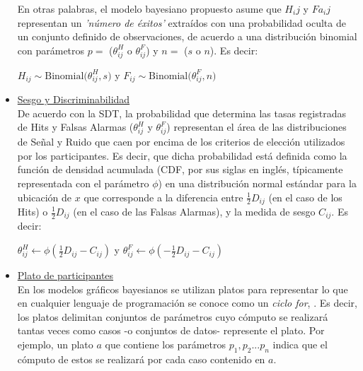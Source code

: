 \begin{itemize}
En otras palabras, el modelo bayesiano propuesto asume que $H_ij$ y $Fa_ij$ representan un \textit{'número de éxitos'} extraídos con una probabilidad oculta de un conjunto definido de observaciones, de acuerdo a una distribución binomial con parámetros $p=$ ($\theta^H_{ij}$ o $\theta^F_{ij}$) y $n=$ ($s$ o $n$). Es decir:\\

\begin{center}
$H_{ij}\sim \mathrm{Binomial}\bigl(\theta^H_{ij}, s)$
y
$F_{ij}\sim \mathrm{Binomial}\bigl(\theta^F_{ij}, n)$\\
\end{center}

\item \underline{Sesgo y Discriminabilidad}\\

De acuerdo con la SDT, la probabilidad que determina las tasas registradas de Hits y Falsas Alarmas ($\theta^H_{ij}$ y $\theta^F_{ij}$) representan el área de las distribuciones de Señal y Ruido que caen por encima de los criterios de elección utilizados por los participantes. Es decir, que dicha probabilidad está definida como la función de densidad acumulada (CDF, por sus siglas en inglés, típicamente representada con el parámetro $\phi$) en una distribución normal estándar para la ubicación de $x$ que corresponde a la diferencia entre $\frac{1}{2}D_{ij}$ (en el caso de los Hits) o $\frac{1}{2}D_{ij}$ (en el caso de las Falsas Alarmas), y la medida de sesgo $C_{ij}$. Es decir:\\

\begin{center}
$\theta^H_{ij}\gets \phi (\frac{1}{2}D_{ij}-C_{ij})$
y
$\theta^F_{ij}\gets \phi (-\frac{1}{2}D_{ij}-C_{ij})$\\
\end{center}

\CONSIDERAR \AGREGAR \UNA \FIGURA \ILUSTRATIVA

\item \underline{Plato de participantes}\\

En los modelos gráficos bayesianos se utilizan platos para representar lo que en cualquier lenguaje de programación se conoce como un \textit{ciclo for}, \parencite{LeeBook}. Es decir, los platos delimitan conjuntos de parámetros cuyo cómputo se realizará tantas veces como casos -o conjuntos de datos- represente el plato. Por ejemplo, un plato $a$ que contiene los parámetros $p_1, p_2... p_n$ indica que el cómputo de estos se realizará por cada caso contenido en $a$.\\


\end{itemize}
